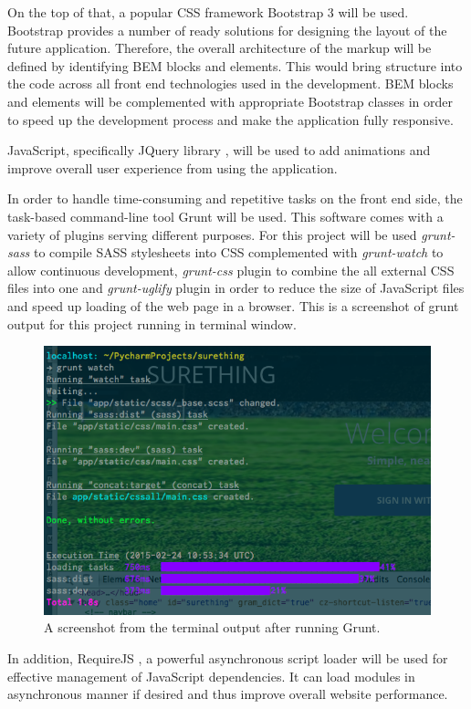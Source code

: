 On the top of that, a popular CSS framework Bootstrap 3 \cite{documentation:Bootstrap3} will be used. Bootstrap provides a number of ready solutions for designing the layout of the future application. Therefore, the overall architecture of the markup will be defined by identifying BEM blocks and elements. This would bring structure into the code across all front end technologies used in the development. BEM blocks and elements will be complemented with appropriate Bootstrap classes in order to speed up the development process and make the application fully responsive.
 
JavaScript, specifically JQuery library \cite{documentation:jQuery}, will be used to add animations and improve overall user experience from using the application.  

In order to handle time-consuming and repetitive tasks on the front end side, the task-based command-line tool Grunt will be used. This software comes with a variety of plugins serving different purposes. For this project will be used \emph{grunt-sass} to compile SASS stylesheets into CSS complemented with \emph{grunt-watch} to allow continuous development, \emph{grunt-css} plugin to combine the all external CSS files into one and \emph{grunt-uglify} plugin in order to reduce the size of JavaScript files and speed up loading of the web page in a browser. This is a screenshot of grunt output for this project running in terminal window.

\begin{figure}[H]
	\begin{center}
		\includegraphics[width=.60\linewidth,natwidth=610,natheight=540]{impl/images/gruntInAction}
		\caption{A screenshot from the terminal output after running Grunt.} \label{fig:using:gruntInAction}
	\end{center}
\end{figure}
	
In addition, RequireJS  \cite{documentation:RequireJS}, a powerful asynchronous script loader will be used for effective management of JavaScript dependencies. It can load modules in asynchronous manner if desired and thus improve overall website performance.

